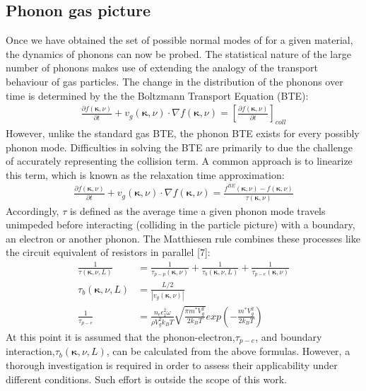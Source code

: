 \documentclass{article}
\numberwithin{equation}{section}
\begin{document}
\subsection{Phonon gas picture}
Once we have obtained the set of possible normal modes of for a given material, the dynamics of phonons can now be probed. The statistical nature of the large number of phonons makes use of extending the analogy of the transport behaviour of gas particles. The change in the distribution of the phonons over time is determined by the the Boltzmann Transport Equation (BTE):
\begin{align*}
	\frac{\partial f(\pmb{\kappa}, \nu)}{\partial t}+v_g(\pmb{\kappa}, \nu)\cdot\nabla f(\pmb{\kappa}, \nu)= [\frac{\partial f(\pmb{\kappa}, \nu)}{\partial t}]_{coll}
\end{align*}
However, unlike the standard gas BTE, the phonon BTE exists for every possibly phonon mode. Difficulties in solving the BTE are primarily to due the challenge of accurately representing the collision term. A common approach is to linearize this term, which is known as the relaxation time approximation:
\begin{align*}
	\frac{\partial f(\pmb{\kappa}, \nu)}{\partial t}+v_g(\pmb{\kappa}, \nu)\cdot\nabla f(\pmb{\kappa}, \nu)= \frac{f^{BE}(\pmb{\kappa}, \nu)-f(\pmb{\kappa}, \nu)}{\tau(\pmb{\kappa}, \nu)}
\end{align*}
Accordingly, $\tau$ is defined as the average time a given phonon mode travels unimpeded before interacting (colliding in the particle picture) with a boundary, an electron or another phonon. The Matthiesen rule combines these processes like the circuit equivalent of resistors in parallel [7]:
\begin{align*}
\frac{1}{\tau(\pmb{\kappa}, \nu,L)}&=\frac{1}{\tau_{p-p}(\pmb{\kappa}, \nu)}+\frac{1}{\tau_{b}(\pmb{\kappa}, \nu,L)}+\frac{1}{\tau_{p-e}(\pmb{\kappa},\nu)}\\
\tau_{b}(\pmb{\kappa}, \nu,L)&=\frac{L/2}{|v_g(\pmb{\kappa}, \nu)|}\\
\frac{1}{\tau_{p-e}}&=\frac{n_e\epsilon_1^2\omega}{\rho V_g^2k_BT}\sqrt{\frac{\pi m^{*}V_g^2}{2k_BT}}exp(-\frac{m^{*}V_g^2}{2k_BT})
\end{align*}
At this point it is assumed that the phonon-electron,$\tau_{p-e}$, and boundary interaction,$\tau_{b}(\pmb{\kappa}, \nu,L)$, can be calculated from the above formulas. However, a thorough investigation is required in order to assess their applicability under different conditions. Such effort is outside the scope of this work. 
\end{document}
